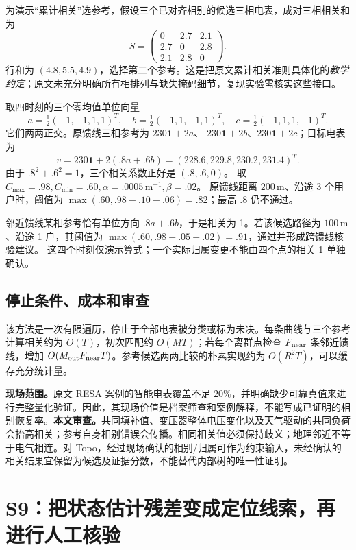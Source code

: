 \begin{example}[最高相关不一定被原馈线接受]
为演示“累计相关”选参考，假设三个已对齐相别的候选三相电表，成对三相相关和为
\[
 S=\begin{pmatrix}0&2.7&2.1\\2.7&0&2.8\\2.1&2.8&0\end{pmatrix}.
\]
行和为 $(4.8,5.5,4.9)$，选择第二个参考。这是把原文累计相关准则具体化的\emph{教学约定}；原文未充分明确所有相排列与缺失掩码细节，复现实验需核实这些接口。

取四时刻的三个零均值单位向量
\[
 a=\tfrac12(-1,-1,1,1)^T,\quad
 b=\tfrac12(-1,1,-1,1)^T,\quad
 c=\tfrac12(-1,1,1,-1)^T.
\]
它们两两正交。原馈线三相参考为 $230\boldsymbol1+2a$、
$230\boldsymbol1+2b$、$230\boldsymbol1+2c$；目标电表为
\[
 v=230\boldsymbol1+2(.8a+.6b)=(228.6,229.8,230.2,231.4)^T.
\]
由于 $.8^2+.6^2=1$，三个相关系数正好是 $(.8,.6,0)$。
取 $C_{\max}=.98,C_{\min}=.60,\alpha=.0005\,\mathrm{m}^{-1},\beta=.02$。
原馈线距离 $200\,\mathrm m$、沿途 3 个用户时，阈值为
$\max(.60,.98-.10-.06)=.82$；最高 $.8$ 仍不通过。

邻近馈线某相参考恰有单位方向 $.8a+.6b$，于是相关为 1。若该候选路径为 $100\,\mathrm m$、沿途 1 户，其阈值为
$\max(.60,.98-.05-.02)=.91$，通过并形成跨馈线核验建议。
这四个时刻仅演示算式；一个实际归属变更不能由四个点的相关 1 单独确认。
\end{example}

\subsection{停止条件、成本和审查}

该方法是一次有限遍历，停止于全部电表被分类或标为未决。每条曲线与三个参考计算相关约为 $O(T)$，初次匹配约 $O(MT)$；若每个离群点检查 $F_{\rm near}$ 条邻近馈线，增加 $O(M_{\rm out}F_{\rm near}T)$。参考候选两两比较的朴素实现约为 $O(R^2T)$，可以缓存充分统计量。

\textbf{现场范围。}原文 RESA 案例的智能电表覆盖不足 $20\%$，并明确缺少可靠真值来进行完整量化验证。因此，其现场价值是档案筛查和案例解释，不能写成已证明的相别恢复率。\textbf{本文审查。}共同填补值、变压器整体电压变化以及天气驱动的共同负荷会抬高相关；参考自身相别错误会传播。相同相关值必须保持歧义；地理邻近不等于电气相连。对 Topo，经过现场确认的相别/归属可作为约束输入，未经确认的相关结果宜保留为候选及证据分数，不能替代内部树的唯一性证明。

\section{S9：把状态估计残差变成定位线索，再进行人工核验}
\label{sec:dq_s9}

